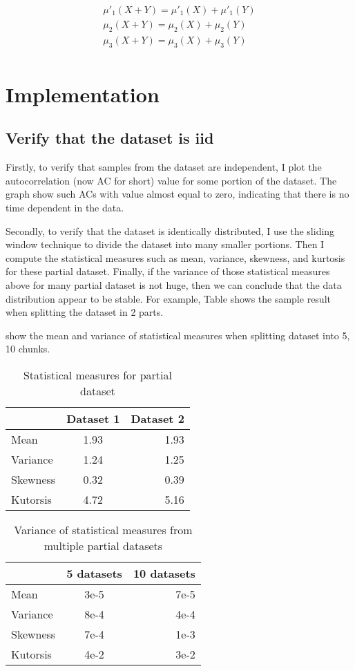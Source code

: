 \documentclass[conference]{IEEEtran}
\begin{document}
\begin{align*}
\mu'_{1}(X + Y) = \mu'_{1}(X) + \mu'_{1}(Y) \\
\mu_{2}(X + Y) = \mu_{2}(X) + \mu_{2}(Y) \\
\mu_{3}(X + Y) = \mu_{3}(X) + \mu_{3}(Y) \\
\end{align*}

\section{Implementation}

\subsection{Verify that the dataset is iid}
Firstly, to verify that samples from the dataset are independent, I plot the autocorrelation (now AC for short) value for some portion of the dataset. The graph show such ACs with value almost equal to zero, indicating that there is no time dependent in the data.

Secondly, to verify that the dataset is identically distributed, I use the sliding window technique to divide the dataset into many smaller portions. Then I compute the statistical measures such as mean, variance, skewness, and kurtosis for these partial dataset. Finally, if the variance of those statistical measures above for many partial dataset is not huge, then we can conclude that the data distribution appear to be stable. For example, Table  shows the sample result when splitting the dataset in 2 parts. 

 show the mean and variance of statistical measures when splitting dataset into 5, 10 chunks.

\begin{table}
\centering
\caption{Statistical measures for partial dataset}
\label{iid_table}
\begin{tabular}{lcr}
\toprule
 & Dataset 1 & Dataset 2 \\
 \midrule
Mean & 1.93 & 1.93 \\
Variance & 1.24 & 1.25 \\
Skewness & 0.32 & 0.39 \\
Kutorsis & 4.72 & 5.16 \\
\bottomrule
\end{tabular}
\end{table}

\begin{table}
\centering
\caption{Variance of statistical measures from multiple partial datasets}
\label{iid_table2}
\begin{tabular}{lcr}
\toprule
 & 5 datasets & 10 datasets \\
 \midrule
Mean & 3e-5 & 7e-5 \\
Variance & 8e-4 & 4e-4 \\
Skewness & 7e-4 & 1e-3 \\
Kutorsis & 4e-2 & 3e-2 \\
\bottomrule
\end{tabular}
\end{table}
\end{document}
